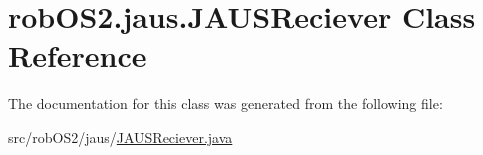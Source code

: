 \hypertarget{classrob_o_s2_1_1jaus_1_1_j_a_u_s_reciever}{
\section{robOS2.jaus.JAUSReciever Class Reference}
\label{classrob_o_s2_1_1jaus_1_1_j_a_u_s_reciever}
}


The documentation for this class was generated from the following file:\begin{DoxyCompactItemize}
\item 
src/robOS2/jaus/\hyperlink{_j_a_u_s_reciever_8java}{JAUSReciever.java}\end{DoxyCompactItemize}
